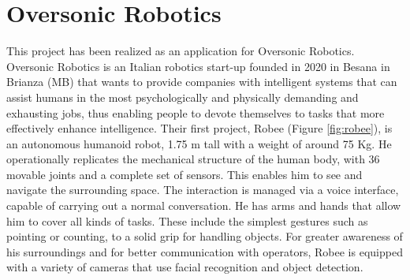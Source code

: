 \section{Oversonic Robotics}
This project has been realized as an application for Oversonic Robotics.\\
Oversonic Robotics is an Italian robotics start-up founded in 2020 in Besana in Brianza (MB) that wants to provide companies with intelligent systems that can assist humans in the most psychologically and physically demanding and exhausting jobs, thus enabling people to devote themselves to tasks that more effectively enhance intelligence.
Their first project, Robee (Figure \ref{fig:robee}), is an autonomous humanoid robot, 1.75 m tall with a weight of around 75 Kg. He operationally replicates the mechanical structure of the human body, with 36 movable joints and a complete set of sensors. This enables him to see and navigate the surrounding space. The interaction is managed via a voice interface, capable of carrying out a normal conversation. He has arms and hands that allow him to cover all kinds of tasks. These include the simplest gestures such as pointing or counting, to a solid grip for handling objects. For greater awareness of his surroundings and for better communication with operators, Robee is equipped with a variety of cameras that use facial recognition and object detection. 

